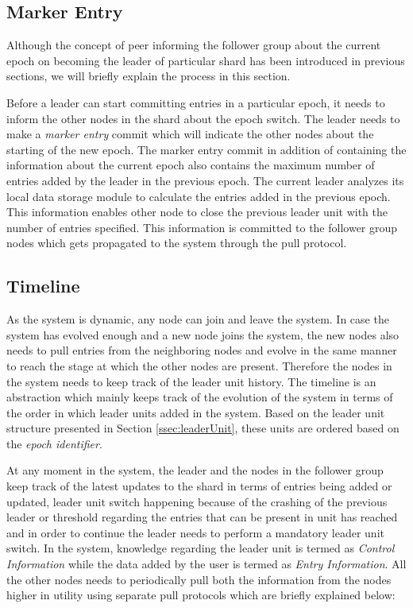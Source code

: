 \documentclass[a4paper,11pt]{kth-mag}
\begin{document}
\subsection{Marker Entry}

Although the concept of peer informing the follower group about the current epoch on becoming the leader of particular shard has been introduced in previous sections, we will briefly explain the process in this section.

\par Before a leader can start committing entries in a particular epoch, it needs to inform the other nodes in the shard about the epoch switch. The leader needs to make a \textit{marker entry} commit which will indicate the other nodes about the starting of the new epoch. The marker entry commit in addition of containing the information about the current epoch also contains the maximum number of entries added by the leader in the previous epoch. The current leader analyzes its local data storage module to calculate the entries added in the previous epoch. This information enables other node to close the previous leader unit with the number of entries specified. This information is committed to the follower group nodes which gets propagated to the system through the pull protocol.

\subsection{Timeline}
\label{ssec:timeline}

As the system is dynamic, any node can join and leave the system. In case the system has evolved enough and a new node joins the system, the new nodes also needs to pull entries from the neighboring nodes and evolve in the same manner to reach the stage at which the other nodes are present. Therefore the nodes in the system needs to keep track of the leader unit history. The timeline is an abstraction which mainly keeps track of the evolution of the system in terms of the order in which leader units added in the system. Based on the leader unit structure presented in Section \ref{ssec:leaderUnit}, these units are ordered based on the \textit{epoch identifier}.

\par At any moment in the system, the leader and the nodes in the follower group keep track of the latest updates to the shard in terms of entries being added or updated, leader unit switch happening because of the crashing of the previous leader or threshold regarding the entries that can be present in unit has reached and in order to continue the leader needs to perform a mandatory leader unit switch. In the system, knowledge regarding the leader unit is termed as \textit{Control Information} while the data added by the user is termed as \textit{Entry Information}. All the other nodes needs to periodically pull both the information from the nodes higher in utility using separate pull protocols which are briefly explained below:
\end{document}
